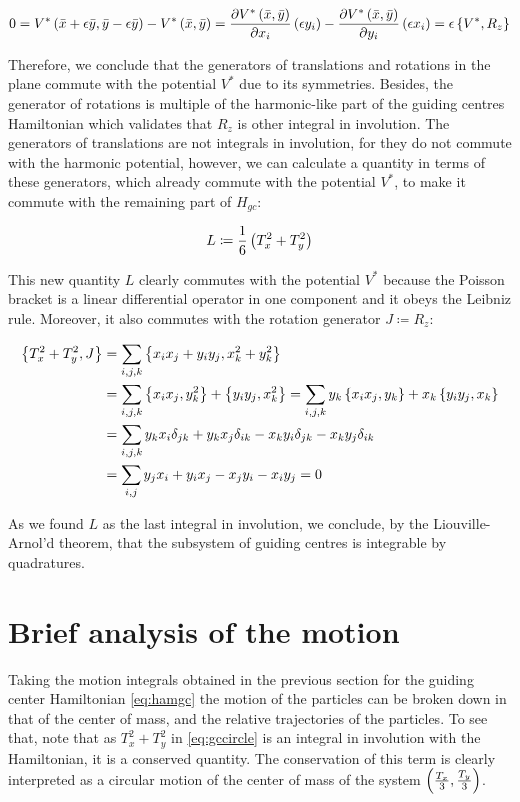 \begin{equation*}
0={V^*\left( \bar{x} +\epsilon \bar{y}, \bar{y} - \epsilon \bar{y} \right)-V^*\left( \bar{x},\bar{y} \right)}
= \frac{\partial V^*\left( \bar{x},\bar{y} \right)}{\partial x_i} \left( \epsilon y_i \right) -                                \frac{\partial V^*\left( \bar{x},\bar{y} \right)}{\partial y_i} \left( \epsilon x_i \right)                                        = \epsilon \left\lbrace V^*, R_z \right\rbrace
\end{equation*}

Therefore, we conclude that the generators of translations and rotations in the plane commute with the potential $V^*$ due to its symmetries. Besides, the generator of rotations is multiple of the harmonic-like part of the guiding centres Hamiltonian which validates that $R_z$ is other integral in involution. The generators of translations are not integrals in involution, for they do not commute with the harmonic potential, however, we can calculate a quantity in terms of these generators, which already commute with the potential $V^*$, to make it commute with the remaining part of $H_{gc}$: 

\begin{equation}
L \coloneqq \frac{1}{6}\left( T_x^2 + T_y^2 \right)
\label{eq:gccircle}
\end{equation}

This new quantity $L$ clearly commutes with the potential $V^*$ because the Poisson bracket is  a linear differential operator in one component and it obeys the Leibniz rule. Moreover, it also commutes with the rotation generator $J \coloneqq R_z$:

\begin{align*}
\left\lbrace T_x^2+ T_y^2,  J \right\rbrace &= \sum_{i,j,k} \left\lbrace x_ix_j + y_iy_j, x_k^2 + y_k^2 \right\rbrace\\
&= \sum_{i,j,k}  \left\lbrace x_ix_j, y_k^2 \right\rbrace + \left\lbrace y_iy_j, x_k^2 \right\rbrace = \sum_{i,j,k} y_k \left\lbrace x_ix_j, y_k \right\rbrace + x_k \left\lbrace y_iy_j, x_k \right\rbrace\\
&= \sum_{i,j,k} y_kx_i\delta_{jk}+y_kx_j\delta_{ik} - x_ky_i\delta_{jk}- x_ky_j\delta_{ik}\\
&= \sum_{i,j} y_jx_i + y_ix_j - x_jy_i - x_iy_j = 0
\end{align*}

As we found $L$ as the last integral in involution, we conclude, by the Liouville-Arnol'd theorem, that the subsystem of guiding centres is integrable by quadratures.\\

\section{Brief analysis of the motion}
Taking the motion integrals obtained in the previous section for the guiding center Hamiltonian \eqref{eq:hamgc} the motion of the particles can be broken down in that of the center of mass, and the relative trajectories of the particles. To see that, note that as $T_x^2 + T_y^2$ in \eqref{eq:gccircle} is an integral in involution with the Hamiltonian, it is a conserved quantity. The conservation of this term is clearly interpreted as a circular motion of the center of mass of the system $\left( \frac{T_x}{3},\frac{T_y}{3} \right)$.\\

